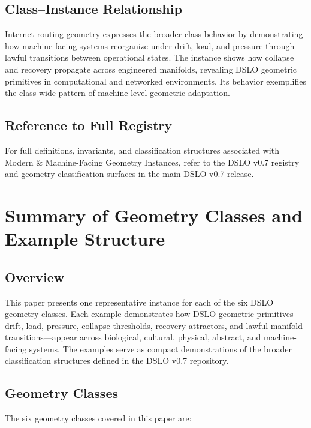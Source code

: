\subsection{Class--Instance Relationship}
Internet routing geometry expresses the broader class behavior by demonstrating how machine-facing 
systems reorganize under drift, load, and pressure through lawful transitions between operational 
states. The instance shows how collapse and recovery propagate across engineered manifolds, revealing 
DSLO geometric primitives in computational and networked environments. Its behavior exemplifies the 
class-wide pattern of machine-level geometric adaptation.

\subsection{Reference to Full Registry}
For full definitions, invariants, and classification structures associated with Modern \& Machine-Facing 
Geometry Instances, refer to the DSLO v0.7 registry and geometry classification surfaces in the main 
DSLO v0.7 release.


\section{Summary of Geometry Classes and Example Structure}
\label{sec:summary}

\subsection{Overview}
This paper presents one representative instance for each of the six DSLO geometry classes. 
Each example demonstrates how DSLO geometric primitives---drift, load, pressure, collapse thresholds, 
recovery attractors, and lawful manifold transitions---appear across biological, cultural, physical, 
abstract, and machine-facing systems. The examples serve as compact demonstrations of the broader 
classification structures defined in the DSLO v0.7 repository.

\subsection{Geometry Classes}
The six geometry classes covered in this paper are:

